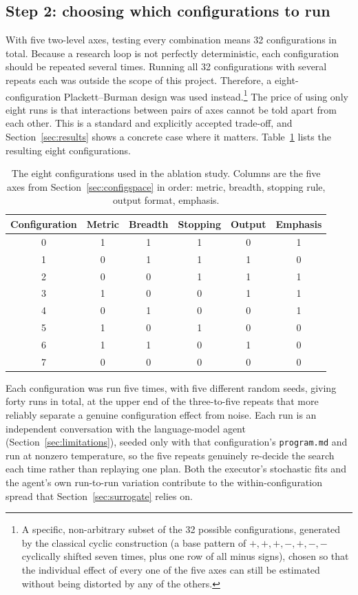\documentclass[11pt]{article}
\begin{document}
\subsection{Step 2: choosing which configurations to run}
\label{sec:doe}

With five two-level axes, testing every combination means 32 configurations in total. Because a research loop is not perfectly deterministic, each configuration should be repeated several times. Running all 32 configurations with several repeats each was outside the scope of this project. Therefore, a eight-configuration Plackett--Burman design was used instead.\footnote{A specific, non-arbitrary subset of the 32 possible configurations, generated by the classical cyclic construction (a base pattern of $+,+,+,-,+,-,-$ cyclically shifted seven times, plus one row of all minus signs), chosen so that the individual effect of every one of the five axes can still be estimated without being distorted by any of the others.} The price of using only eight runs is that interactions between pairs of axes cannot be told apart from each other. This is a standard and explicitly accepted trade-off, and Section~\ref{sec:results} shows a concrete case where it matters. Table~\ref{tab:design} lists the resulting eight configurations.

\begin{table}[h]
\centering
\caption{The eight configurations used in the ablation study. Columns are the five axes from Section~\ref{sec:configspace} in order: metric, breadth, stopping rule, output format, emphasis.}
\label{tab:design}
\begin{tabular}{cccccc}
\toprule
Configuration & Metric & Breadth & Stopping & Output & Emphasis \\
\midrule
0 & 1 & 1 & 1 & 0 & 1 \\
1 & 0 & 1 & 1 & 1 & 0 \\
2 & 0 & 0 & 1 & 1 & 1 \\
3 & 1 & 0 & 0 & 1 & 1 \\
4 & 0 & 1 & 0 & 0 & 1 \\
5 & 1 & 0 & 1 & 0 & 0 \\
6 & 1 & 1 & 0 & 1 & 0 \\
7 & 0 & 0 & 0 & 0 & 0 \\
\bottomrule
\end{tabular}
\end{table}

Each configuration was run five times, with five different random seeds, giving forty runs in total, at the upper end of the three-to-five repeats that more reliably separate a genuine configuration effect from noise. Each run is an independent conversation with the language-model agent (Section~\ref{sec:limitations}), seeded only with that configuration's \texttt{program.md} and run at nonzero temperature, so the five repeats genuinely re-decide the search each time rather than replaying one plan. Both the executor's stochastic fits and the agent's own run-to-run variation contribute to the within-configuration spread that Section~\ref{sec:surrogate} relies on.
\end{document}
